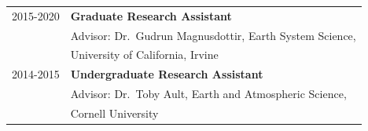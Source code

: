 \documentclass[margin,line,palatino,courier,10pt]{res}
\begin{document}
\begin{resume}
\begin{tabular}{@{}p{0.9in}p{4in}}
2015-2020 & \textbf{Graduate Research Assistant}\\
& \hspace{0.2in} Advisor: Dr.\ Gudrun Magnusdottir, Earth System Science,\\
& \vspace{-0.18in}\hspace{0.2in} University of California, Irvine\\


2014-2015 & \textbf{Undergraduate Research Assistant}\\
& \hspace{0.2in} Advisor: Dr.\ Toby Ault, Earth and Atmospheric Science, \\
& \vspace{-0.18in}\hspace{0.2in} Cornell University\\
\end{tabular}

\vspace{-0.1in}
\noindent\textcolor{MidnightBlue}{\makebox[\linewidth][r]{\rule{\textwidth}{5pt}}}
\vspace{-0.3in}

\newpage

\end{resume}
\end{document}
